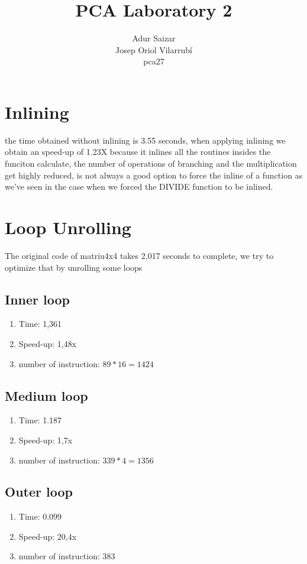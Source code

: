 \documentclass[10pt,a4paper]{article}
\author{Adur Saizar\\ Josep Oriol Vilarrubí\\ pca27}
\title{PCA Laboratory 2}
\begin{document}
\maketitle
\tableofcontents
\pagebreak
\section{Inlining}
the time obtained without inlining is 3.55 seconds, when applying inlining we obtain an speed-up of 1.23X because it inlines all the routines insides the funciton calculate, the number of operations of branching and the multiplication get highly reduced, is not always a good option to force the inline of a function as we've seen in the case when we forced the DIVIDE function to be inlined.
\section{Loop Unrolling}
The original code of matriu4x4 takes 2,017 seconds to complete, we try to optimize that by unrolling some loops
\subsection{Inner loop}
\begin{enumerate}
\item Time: 1,361
\item Speed-up: 1,48x
\item number of instruction: $89 * 16 = 1424$
\end{enumerate}

\subsection{Medium loop}
\begin{enumerate}
\item Time: 1.187
\item Speed-up: 1,7x
\item number of instruction: $339 * 4 = 1356$
\end{enumerate}

\subsection{Outer loop}
\begin{enumerate}
\item Time: 0.099
\item Speed-up: 20,4x
\item number of instruction: 383
\end{enumerate}
\end{document}

